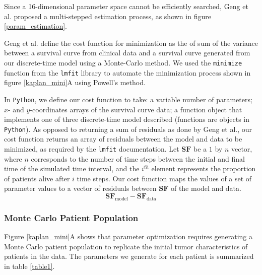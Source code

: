\documentclass[letterpaper
, superscriptaddress
, twocolumn
, aps
]{revtex4}
\begin{document}
Since a 16-dimensional parameter space cannot be efficiently searched, Geng et al. proposed a multi-stepped estimation process, as shown in figure \ref{param_estimation}.

Geng et al. define the cost function for minimization as the of sum of the variance between a survival curve from clinical data and a survival curve generated from our discrete-time model using a Monte-Carlo method. We used the \texttt{minimize} function from the \texttt{lmfit} library \cite{Newville2014} to automate the minimization process shown in figure \ref{kaplan_mini}A using Powell's method.

In \texttt{Python}, we define our cost function to take: a variable number of parameters; $x$- and $y$-coordinates arrays of the survival curve data; a function object that implements one of three discrete-time model described (functions are objects in \texttt{Python}). As opposed to returning a sum of residuals as done by Geng et al., our cost function returns an array of residuals between the model and data to be minimized, as required by the \texttt{lmfit} documentation. Let $\mathbf{SF}$ be a $1$ by $n$ vector, where $n$ corresponds to the number of time steps between the initial and final time of the simulated time interval, and the $i^{th}$ element represents the proportion of patients alive after $i$ time steps. Our cost function maps the values of a set of parameter values to a vector of residuals between $\mathbf{SF}$ of the model and data.
\begin{equation} 
\mathbf{SF}_{\text{model}} - \mathbf{SF}_{\text{data}}
\end{equation}

\subsubsection{Monte Carlo Patient Population}

Figure \ref{kaplan_mini}A shows that parameter optimization requires generating a Monte Carlo patient population to replicate the initial tumor characteristics of patients in the data. The parameters we generate for each patient is summarized in table \ref{table1}. 
\end{document}
